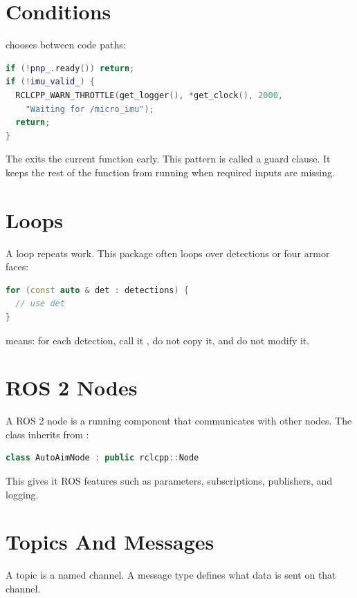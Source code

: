\section{Conditions}

 chooses between code paths:

\begin{lstlisting}[language=C++]
if (!pnp_.ready()) return;
if (!imu_valid_) {
  RCLCPP_WARN_THROTTLE(get_logger(), *get_clock(), 2000,
    "Waiting for /micro_imu");
  return;
}
\end{lstlisting}

The  exits the current function early. This pattern is called a
guard clause. It keeps the rest of the function from running when required
inputs are missing.

\section{Loops}

A loop repeats work. This package often loops over detections or four armor
faces:

\begin{lstlisting}[language=C++]
for (const auto & det : detections) {
  // use det
}
\end{lstlisting}

 means: for each detection, call it , do not
copy it, and do not modify it.

\section{ROS 2 Nodes}

A ROS 2 node is a running component that communicates with other nodes. The
 class inherits from :

\begin{lstlisting}[language=C++]
class AutoAimNode : public rclcpp::Node
\end{lstlisting}

This gives it ROS features such as parameters, subscriptions, publishers, and
logging.

\section{Topics And Messages}

A topic is a named channel. A message type defines what data is sent on that
channel.

